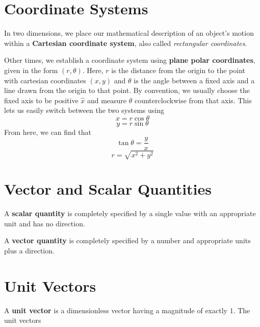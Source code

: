 \section*{Coordinate Systems}

In two dimensions, we place our mathematical description of an object's motion
within a \textbf{Cartesian coordinate system}, also
called \emph{rectangular coordinates}.

Other times, we establish a coordinate system using \textbf{plane polar
coordinates}, given in
the form $(r,\theta)$. Here, $r$ is the distance from the origin to the point
with cartesian coordinates $(x, y)$ and $\theta$ is the angle between a fixed
axis and a line drawn from the origin to that point. By convention, we usually
choose the fixed axis to be positive $\hat x$ and measure $\theta$ counterclockwise
from that axis. This lets us easily switch between the two systems using
\begin{equation}
  \label{eq:xcos}
  x = r \cos \theta
\end{equation}
\begin{equation}
  \label{eq:ysin}
  y = r \sin \theta
\end{equation}
From here, we can find that
\begin{equation}
  \label{eq:tantheta}
  \tan \theta = \frac{y}{x}
\end{equation}
\begin{equation}
  \label{eq:rpyth}
  r = \sqrt{x^2 + y^2}
\end{equation}

\section*{Vector and Scalar Quantities}

A \textbf{scalar quantity} is completely specified by a single value with an
appropriate unit and has no direction.

A \textbf{vector quantity} is completely specified by a number and appropriate
units plus a direction.

\section*{Unit Vectors}

A \textbf{unit vector} is a dimensionless vector having a
magnitude of exactly $1$. The unit vectors


%


